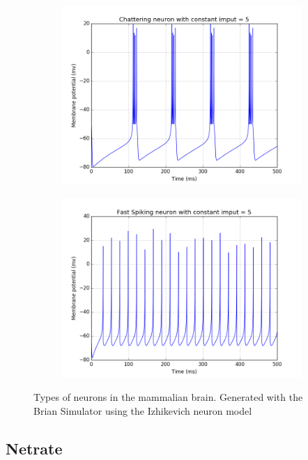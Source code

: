 \documentclass[11pt]{article}
\begin{document}
\begin{figure}
\begin{subfigure}[b]{0.49\textwidth}
		\includegraphics[width=\textwidth]{chattering.png}
	\end{subfigure}
	\begin{subfigure}[b]{0.49\textwidth}
		\includegraphics[width=\textwidth]{fast_spiking.png}
	\end{subfigure}
  \caption{Types of neurons in the mammalian brain. Generated with the Brian Simulator \cite{10.3389/neuro.01.026.2009} using the Izhikevich neuron model \cite{izhikevich2003simple}}
	\label{fig:types_neurons}
\end{figure}


\subsection{Netrate}
\end{document}
